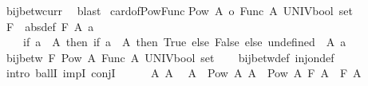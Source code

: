 \begin{isabellebody}
\isamarkupfalse%
\ bij{\isacharunderscore}{\kern0pt}betw{\isacharunderscore}{\kern0pt}curr\ \isamarkupfalse%
\ blast%
\endisatagproof
{\isafoldproof}%
%
\isadelimproof
\isanewline
%
\endisadelimproof
\isanewline
{}\isamarkupfalse%
\ card{\isacharunderscore}{\kern0pt}of{\isacharunderscore}{\kern0pt}Pow{\isacharunderscore}{\kern0pt}Func{\isacharcolon}{\kern0pt}\isanewline
{\isachardoublequoteopen}{\isacharbar}{\kern0pt}Pow\ A{\isacharbar}{\kern0pt}\ {\isacharequal}{\kern0pt}o\ {\isacharbar}{\kern0pt}Func\ A\ {\isacharparenleft}{\kern0pt}UNIV{\isacharcolon}{\kern0pt}{\isacharcolon}{\kern0pt}bool\ set{\isacharparenright}{\kern0pt}{\isacharbar}{\kern0pt}{\isachardoublequoteclose}\isanewline
%
\isadelimproof
%
\endisadelimproof
%
\isatagproof
{}\isamarkupfalse%
{\isacharminus}{\kern0pt}\isanewline
\ \ \isamarkupfalse%
\ F\ \ {\isacharbrackleft}{\kern0pt}abs{\isacharunderscore}{\kern0pt}def{\isacharbrackright}{\kern0pt}{\isacharcolon}{\kern0pt}\ {\isachardoublequoteopen}F\ A{\isacharprime}{\kern0pt}\ a\ {\isacharequal}{\kern0pt}\isanewline
\ \ \ \ {\isacharparenleft}{\kern0pt}if\ a\ {\isasymin}\ A\ then\ {\isacharparenleft}{\kern0pt}if\ a\ {\isasymin}\ A{\isacharprime}{\kern0pt}\ then\ True\ else\ False{\isacharparenright}{\kern0pt}\ else\ undefined{\isacharparenright}{\kern0pt}{\isachardoublequoteclose}\ \ A{\isacharprime}{\kern0pt}\ a\isanewline
\ \ \isamarkupfalse%
\ {\isachardoublequoteopen}bij{\isacharunderscore}{\kern0pt}betw\ F\ {\isacharparenleft}{\kern0pt}Pow\ A{\isacharparenright}{\kern0pt}\ {\isacharparenleft}{\kern0pt}Func\ A\ {\isacharparenleft}{\kern0pt}UNIV{\isacharcolon}{\kern0pt}{\isacharcolon}{\kern0pt}bool\ set{\isacharparenright}{\kern0pt}{\isacharparenright}{\kern0pt}{\isachardoublequoteclose}\isanewline
\ \ \isamarkupfalse%
\ bij{\isacharunderscore}{\kern0pt}betw{\isacharunderscore}{\kern0pt}def\ inj{\isacharunderscore}{\kern0pt}on{\isacharunderscore}{\kern0pt}def\ \isamarkupfalse%
\ {\isacharparenleft}{\kern0pt}intro\ ballI\ impI\ conjI{\isacharparenright}{\kern0pt}\isanewline
\ \ \ \ \isamarkupfalse%
\ A{}\ A{}\ \isamarkupfalse%
\ {\isachardoublequoteopen}A{}\ {\isasymin}\ Pow\ A{\isachardoublequoteclose}\ {\isachardoublequoteopen}A{}\ {\isasymin}\ Pow\ A{\isachardoublequoteclose}\ {\isachardoublequoteopen}F\ A{}\ {\isacharequal}{\kern0pt}\ F\ A{}{\isachardoublequoteclose}\isanewline

\end{isabellebody}
